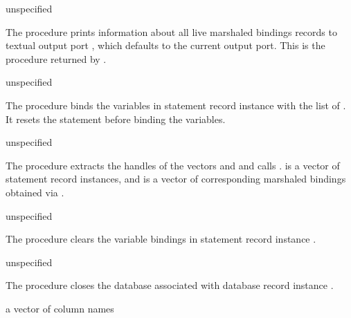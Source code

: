 \begin{procedure}
\end{procedure}
\returns{} unspecified

The  procedure prints information about all
live marshaled bindings records to textual output port , which
defaults to the current output port.
This is the procedure returned by .

\begin{procedure}
\end{procedure}
\returns{} unspecified

The  procedure binds the variables in statement
record instance  with the list of . It resets
the statement before binding the variables.

\begin{procedure}
\end{procedure}
\returns{} unspecified

The  procedure extracts the handles of the
vectors  and  and calls
.   is a vector of statement
record instances, and  is a vector of corresponding
marshaled bindings obtained via .

\begin{procedure}
\end{procedure}
\returns{} unspecified

The  procedure clears the variable
bindings in statement record instance .

\begin{procedure}
\end{procedure}
\returns{} unspecified

The  procedure closes the database associated with
database record instance .

\begin{procedure}
\end{procedure}
\returns{} a vector of column names

